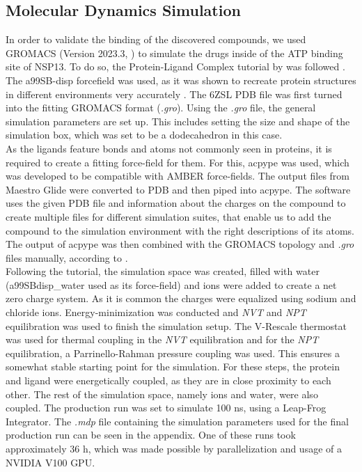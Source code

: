 \documentclass[11pt, letterpaper, titlepage]{article}
\renewcommand{\cite}{\parencite}
\begin{document}
\subsection{Molecular Dynamics Simulation}
In order to validate the binding of the discovered compounds, we used GROMACS (Version 2023.3, \textcite{packageGROMACS}) to simulate the drugs inside of the ATP binding site of NSP13. To do so, the Protein-Ligand Complex tutorial by  was followed \cite{Lemkul2018}. The a99SB-disp forcefield was used, as it was shown to recreate protein structures in different environments very accurately \cite{Forcefield}. The 6ZSL PDB file was first turned into the fitting GROMACS format (\textit{.gro}). Using the \textit{.gro} file, the general simulation parameters are set up. This includes setting the size and shape of the simulation box, which was set to be a dodecahedron in this case. \\ 
\noindent As the ligands feature bonds and atoms not commonly seen in proteins, it is required to create a fitting force-field for them. For this, acpype \cite{acpype} was used, which was developed to be compatible with AMBER force-fields. The output files from Maestro Glide were converted to PDB and then piped into acpype. The software uses the given PDB file and information about the charges on the compound to create multiple files for different simulation suites, that enable us to add the compound to the simulation environment with the right descriptions of its atoms.  The output of acpype was then combined with the GROMACS topology and \textit{.gro} files manually, according to \textcite{Lemkul2018}. \\
\noindent Following the tutorial, the simulation space was created, filled with water (a99SBdisp\_water used as its force-field) and ions were added to create a net zero charge system. As it is common the charges were equalized using sodium and chloride ions. Energy-minimization was conducted and \textit{NVT} and \textit{NPT} equilibration was used to finish the simulation setup. The V-Rescale thermostat was used for thermal coupling in the \textit{NVT} equilibration and for the \textit{NPT} equilibration, a Parrinello-Rahman pressure coupling was used. This ensures a somewhat stable starting point for the simulation. For these steps, the protein and ligand were energetically coupled, as they are in close proximity to each other. The rest of the simulation space, namely ions and water, were also coupled. The production run was set to simulate 100 ns, using a Leap-Frog Integrator. The \textit{.mdp} file containing the simulation parameters used for the final production run can be seen in the appendix. One of these runs took approximately  36 h, which was made possible by parallelization and usage of a NVIDIA V100 GPU. \\ 
\end{document}
